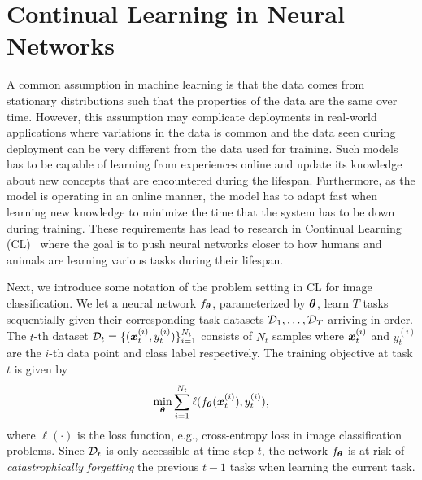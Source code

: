 \section{Continual Learning in Neural Networks}
\label{sec:continual_learning}

A common assumption in machine learning is that the data comes from stationary distributions such that the properties of the data are the same over time. However, this assumption may complicate deployments in real-world applications where variations in the data is common and the data seen during deployment can be very different from the data used for training. Such models has to be capable of learning from experiences online and update its knowledge about new concepts that are encountered during the lifespan. Furthermore, as the model is operating in an online manner, the model has to adapt fast when learning new knowledge to minimize the time that the system has to be down during training. These requirements has lead to research in Continual Learning (CL)~\cite{delange2021continual, parisi2019continual} where the goal is to push neural networks closer to how humans and animals are learning various tasks during their lifespan.

Next, we introduce some notation of the problem setting in CL for image classification. We let a neural network $f_{{\bm{\theta}}}$, parameterized by ${\bm{\theta}}$, learn $T$ tasks sequentially given their corresponding task datasets ${\mathcal{D}}_1, \dots, {\mathcal{D}}_T$ arriving in order. The $t$-th dataset ${\mathcal{D}}_t = \{({\bm{x}}_{t}^{(i)}, y_{t}^{(i)})\}_{i=1}^{N_{t}}$ consists of $N_t$ samples where ${\bm{x}}_{t}^{(i)}$ and $y_{t}^{(i)}$ are the $i$-th data point and class label respectively. The training objective at task $t$ is given by 
\begin{align}
	\underset{{\bm{\theta}}}{\text{min}} \sum_{i=1}^{N_t} \ell(f_{{\bm{\theta}}}({\bm{x}}_t^{(i)}), y_{t}^{(i)}),
\end{align}
where $\ell(\cdot)$ is the loss function, e.g., cross-entropy loss in image classification problems. Since ${\mathcal{D}}_t$ is only accessible at time step $t$, the network $f_{{\bm{\theta}}}$ is at risk of \textit{catastrophically forgetting} the previous $t-1$ tasks when learning the current task. 

